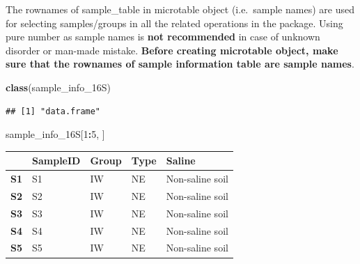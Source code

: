 \documentclass[
]{book}
\newenvironment{Shaded}{\begin{snugshade}}{\end{snugshade}}
\newcommand{\DecValTok}[1]{\textcolor[rgb]{0.00,0.00,0.81}{#1}}
\newcommand{\FunctionTok}[1]{\textcolor[rgb]{0.13,0.29,0.53}{\textbf{#1}}}
\newcommand{\NormalTok}[1]{#1}
\newcommand{\SpecialCharTok}[1]{\textcolor[rgb]{0.81,0.36,0.00}{\textbf{#1}}}
\newcounter{none} %
\begin{document}
The rownames of sample\_table in microtable object (i.e.~sample names) are used for selecting samples/groups in all the related operations in the package.
Using pure number as sample names is \textbf{not recommended} in case of unknown disorder or man-made mistake.
\textbf{Before creating microtable object, make sure that the rownames of sample information table are sample names}.

\begin{Shaded}
\begin{Highlighting}[]
\FunctionTok{class}\NormalTok{(sample\_info\_16S)}
\end{Highlighting}
\end{Shaded}

\begin{verbatim}
## [1] "data.frame"
\end{verbatim}

\begin{Shaded}
\begin{Highlighting}[]
\NormalTok{sample\_info\_16S[}\DecValTok{1}\SpecialCharTok{:}\DecValTok{5}\NormalTok{, ]}
\end{Highlighting}
\end{Shaded}

{\def\LTcaptype{none} %
\begin{longtable}[]{@{}
  >{\centering\arraybackslash}p{}
  >{\centering\arraybackslash}p{}
  >{\centering\arraybackslash}p{}
  >{\centering\arraybackslash}p{}
  >{\centering\arraybackslash}p{}@{}}
\toprule\noalign{}
\begin{minipage}[b]{\linewidth}\centering
~
\end{minipage} & \begin{minipage}[b]{\linewidth}\centering
SampleID
\end{minipage} & \begin{minipage}[b]{\linewidth}\centering
Group
\end{minipage} & \begin{minipage}[b]{\linewidth}\centering
Type
\end{minipage} & \begin{minipage}[b]{\linewidth}\centering
Saline
\end{minipage} \\
\midrule\noalign{}
\endhead
\bottomrule\noalign{}
\endlastfoot
\textbf{S1} & S1 & IW & NE & Non-saline soil \\
\textbf{S2} & S2 & IW & NE & Non-saline soil \\
\textbf{S3} & S3 & IW & NE & Non-saline soil \\
\textbf{S4} & S4 & IW & NE & Non-saline soil \\
\textbf{S5} & S5 & IW & NE & Non-saline soil \\
\end{longtable}
}
\end{document}
